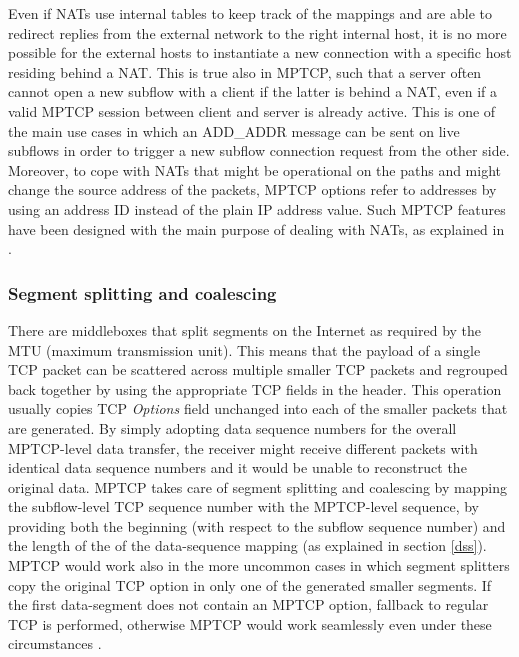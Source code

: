 Even if NATs use internal tables to keep track of the mappings and are able to redirect replies from the external network to the right internal host, it is no more possible for the external hosts to instantiate a new connection with a specific host residing behind a NAT. This is true also in MPTCP, such that a server often cannot open a new subflow with a client if the latter is behind a NAT, even if a valid MPTCP session between client and server is already active. This is one of the main use cases in which an ADD\_ADDR message can be sent on live subflows in order to trigger a new subflow connection request from the other side. Moreover, to cope with NATs that might be operational on the paths and might change the source address of the packets, MPTCP options refer to addresses by using an address ID instead of the plain IP address value. Such MPTCP features have been designed with the main purpose of dealing with NATs, as explained in .

\subsubsection{Segment splitting and coalescing}
There are middleboxes that split segments on the Internet as required by the MTU (maximum transmission unit). This means that the payload of a single TCP packet can be scattered across multiple smaller TCP packets and regrouped back together by using the appropriate TCP fields in the header. This operation usually copies TCP \textit{Options} field unchanged into each of the smaller packets that are generated. By simply adopting data sequence numbers for the overall MPTCP-level data transfer, the receiver might receive different packets with identical data sequence numbers and it would be unable to reconstruct the original data. MPTCP takes care of segment splitting and coalescing by mapping the subflow-level TCP sequence number with the MPTCP-level sequence, by providing both the beginning (with respect to the subflow sequence number) and the length of the of the data-sequence mapping (as explained in section \ref{dss}).
MPTCP would work also in the more uncommon cases in which segment splitters copy the original TCP option in only one of the generated smaller segments. If the first data-segment does not contain an MPTCP option, fallback to regular TCP is performed, otherwise MPTCP would work seamlessly even under these circumstances \cite{HDPDB13}.

